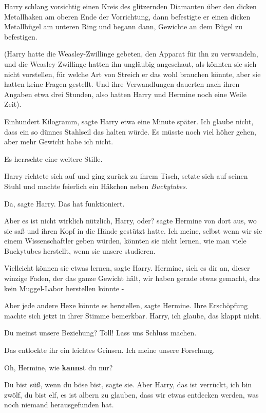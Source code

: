 Harry schlang vorsichtig einen Kreis des glitzernden Diamanten über den dicken
Metallhaken am oberen Ende der Vorrichtung, dann befestigte er einen dicken
Metallbügel am unteren Ring und begann dann, Gewichte an dem Bügel zu
befestigen.

(Harry hatte die Weasley-Zwillinge gebeten, den Apparat für ihn zu verwandeln,
und die Weasley-Zwillinge hatten ihn ungläubig angeschaut, als könnten sie sich
nicht vorstellen, für welche Art von Streich er das wohl brauchen könnte, aber
sie hatten keine Fragen gestellt. Und ihre Verwandlungen dauerten nach ihren
Angaben etwa drei Stunden, also hatten Harry und Hermine noch eine Weile Zeit).

\glqq{}Einhundert Kilogramm\grqq{}, sagte Harry etwa eine Minute später. \glqq{}
Ich glaube nicht, dass ein so dünnes Stahlseil das halten würde. Es müsste noch
viel höher gehen, aber mehr Gewicht habe ich nicht.\grqq{}

Es herrschte eine weitere Stille.

Harry richtete sich auf und ging zurück zu ihrem Tisch, setzte sich auf seinen
Stuhl und machte feierlich ein Häkchen neben \glqq{}\emph{Buckytubes}\grqq{}.

\glqq{}Da\grqq{}, sagte Harry. \glqq{}Das hat funktioniert.\grqq{}

\glqq{}Aber es ist nicht wirklich nützlich, Harry, oder?\grqq{} sagte Hermine
von dort aus, wo sie saß und ihren Kopf in die Hände gestützt hatte. \glqq{}Ich
meine, selbst wenn wir sie einem Wissenschaftler geben würden, könnten sie nicht
lernen, wie man viele Buckytubes herstellt, wenn sie unsere studieren.\grqq{}

\glqq{}Vielleicht können sie etwas lernen\grqq{}, sagte Harry. \glqq{}Hermine,
sieh es dir an, dieser winzige Faden, der das ganze Gewicht hält, wir haben
gerade etwas gemacht, das kein Muggel-Labor herstellen könnte -\grqq{}

\glqq{}Aber jede andere Hexe könnte es herstellen\grqq{}, sagte Hermine. Ihre
Erschöpfung machte sich jetzt in ihrer Stimme bemerkbar. \glqq{}Harry, ich
glaube, das klappt nicht.\grqq{}

\glqq{}Du meinst unsere Beziehung? Toll! Lass uns Schluss machen.\grqq{}

Das entlockte ihr ein leichtes Grinsen. \glqq{}Ich meine unsere
Forschung.\grqq{}

\glqq{}Oh, Hermine, wie \textbf{kannst} du nur?\grqq{}

\glqq{}Du bist süß, wenn du böse bist\grqq{}, sagte sie. \glqq{}Aber Harry, das
ist verrückt, ich bin zwölf, du bist elf, es ist albern zu glauben, dass wir
etwas entdecken werden, was noch niemand herausgefunden hat.\grqq{}

